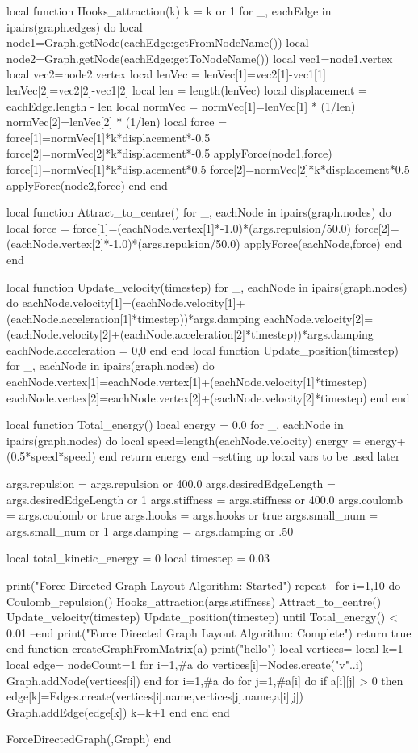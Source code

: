 	local function Hooks_attraction(k)
		k = k or 1
		for _, eachEdge in ipairs(graph.edges) do
			local node1=Graph.getNode(eachEdge:getFromNodeName())
			local node2=Graph.getNode(eachEdge:getToNodeName())
			local vec1=node1.vertex
			local vec2=node2.vertex
			local lenVec = {}
			lenVec[1]=vec2[1]-vec1[1]
			lenVec[2]=vec2[2]-vec1[2]
			local len = length(lenVec)
			local displacement = eachEdge.length - len
			local normVec = {}
			normVec[1]=lenVec[1] * (1/len)
			normVec[2]=lenVec[2] * (1/len)
			local force = {}
			force[1]=normVec[1]*k*displacement*-0.5
			force[2]=normVec[2]*k*displacement*-0.5
			applyForce(node1,force)
			force[1]=normVec[1]*k*displacement*0.5
			force[2]=normVec[2]*k*displacement*0.5
			applyForce(node2,force)
		end
	end

	local function Attract_to_centre()
		for _, eachNode in ipairs(graph.nodes) do
			local force = {}
			force[1]=(eachNode.vertex[1]*-1.0)*(args.repulsion/50.0)
			force[2]=(eachNode.vertex[2]*-1.0)*(args.repulsion/50.0)
			applyForce(eachNode,force)
		end
	end

	local function Update_velocity(timestep)
		for _, eachNode in ipairs(graph.nodes) do
			eachNode.velocity[1]=(eachNode.velocity[1]+(eachNode.acceleration[1]*timestep))*args.damping
			eachNode.velocity[2]=(eachNode.velocity[2]+(eachNode.acceleration[2]*timestep))*args.damping
			eachNode.acceleration = {0,0}
		end
	end
	local function Update_position(timestep)
		for _, eachNode in ipairs(graph.nodes) do
			eachNode.vertex[1]=eachNode.vertex[1]+(eachNode.velocity[1]*timestep)
			eachNode.vertex[2]=eachNode.vertex[2]+(eachNode.velocity[2]*timestep)
		end
	end

	local function Total_energy()
		local energy = 0.0
		for _, eachNode in ipairs(graph.nodes) do
			local speed=length(eachNode.velocity)
			energy = energy+(0.5*speed*speed)
		end
		return energy
	end
	--setting up local vars to be used later 

	args.repulsion = args.repulsion or 400.0
	args.desiredEdgeLength = args.desiredEdgeLength or 1
	args.stiffness = args.stiffness or 400.0
	args.coulomb = args.coulomb or true
	args.hooks = args.hooks or true
	args.small_num = args.small_num or 1
	args.damping = args.damping or .50
	
	local total_kinetic_energy = 0
	local timestep = 0.03

	print("Force Directed Graph Layout Algorithm: Started")
	repeat
	--for i=1,10 do
		Coulomb_repulsion()
		Hooks_attraction(args.stiffness)
		Attract_to_centre()
		Update_velocity(timestep)
		Update_position(timestep)
	until Total_energy() < 0.01
	--end
	print("Force Directed Graph Layout Algorithm: Complete")
	return true
end
function createGraphFromMatrix(a)
	print("hello")
	local vertices={}
	local k=1
	local edge={}
	nodeCount=1
	for i=1,#a do
		vertices[i]=Nodes.create("v"..i)
		Graph.addNode(vertices[i])
	end
	for i=1,#a do
		for j=1,#a[i] do
			if a[i][j] > 0 then
				edge[k]=Edges.create(vertices[i].name,vertices[j].name,a[i][j])
				Graph.addEdge(edge[k])
				k=k+1
			end
		end
	end

	ForceDirectedGraph({},Graph)
end



\stopluacode

